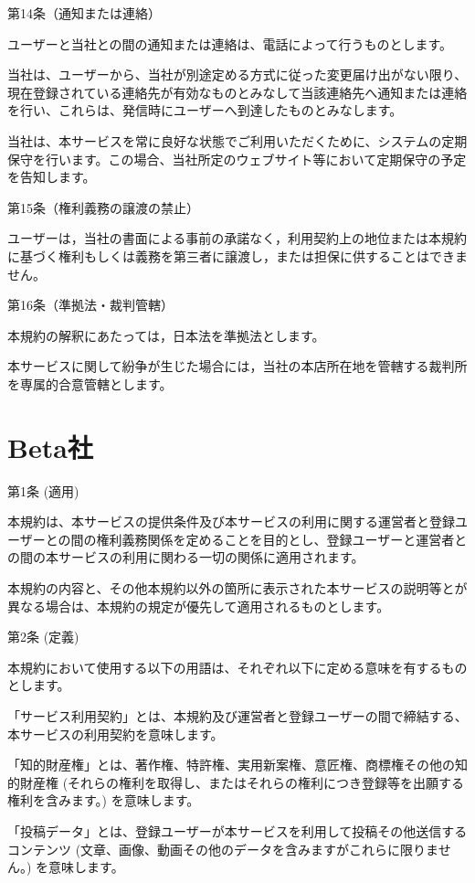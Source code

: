 第14条（通知または連絡）

    ユーザーと当社との間の通知または連絡は、電話によって行うものとします。

    当社は、ユーザーから、当社が別途定める方式に従った変更届け出がない限り、現在登録されている連絡先が有効なものとみなして当該連絡先へ通知または連絡を行い、これらは、発信時にユーザーへ到達したものとみなします。

    当社は、本サービスを常に良好な状態でご利用いただくために、システムの定期保守を行います。この場合、当社所定のウェブサイト等において定期保守の予定を告知します。

第15条（権利義務の譲渡の禁止）

    ユーザーは，当社の書面による事前の承諾なく，利用契約上の地位または本規約に基づく権利もしくは義務を第三者に譲渡し，または担保に供することはできません。

第16条（準拠法・裁判管轄）

    本規約の解釈にあたっては，日本法を準拠法とします。

    本サービスに関して紛争が生じた場合には，当社の本店所在地を管轄する裁判所を専属的合意管轄とします。

\section{Beta社}
第1条 (適用)

    本規約は、本サービスの提供条件及び本サービスの利用に関する運営者と登録ユーザーとの間の権利義務関係を定めることを目的とし、登録ユーザーと運営者との間の本サービスの利用に関わる一切の関係に適用されます。

    本規約の内容と、その他本規約以外の箇所に表示された本サービスの説明等とが異なる場合は、本規約の規定が優先して適用されるものとします。

第2条 (定義)

本規約において使用する以下の用語は、それぞれ以下に定める意味を有するものとします。

    「サービス利用契約」とは、本規約及び運営者と登録ユーザーの間で締結する、本サービスの利用契約を意味します。

    「知的財産権」とは、著作権、特許権、実用新案権、意匠権、商標権その他の知的財産権 (それらの権利を取得し、またはそれらの権利につき登録等を出願する権利を含みます。) を意味します。

    「投稿データ」とは、登録ユーザーが本サービスを利用して投稿その他送信するコンテンツ (文章、画像、動画その他のデータを含みますがこれらに限りません。) を意味します。

